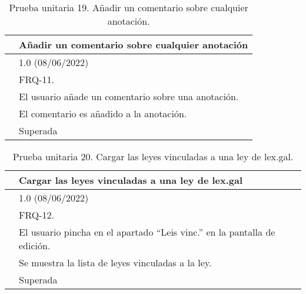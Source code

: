 \begin{table}[H]
\begin{center}
\begin{tabular}{|p{3cm}|p{10cm}|} \hline
\centering {\bf PU-19} & Añadir un comentario sobre cualquier anotación  \\ \hline\hline
\centering {\bf Versión} & 1.0 (08/06/2022) \\ \hline
\centering {\bf Dependencias} & FRQ-11. \\ \hline
\centering {\bf Descripción} &  El usuario añade un comentario sobre una anotación. \\ \hline
\centering {\bf Criterio de aceptación} & El comentario es añadido a la anotación. \\ \hline
\centering {\bf Estado} & Superada \\ \hline
\end{tabular}
\caption{Prueba unitaria 19. Añadir un comentario sobre cualquier anotación.}
\label{enlacePU19}
\end{center}
\end{table}

\begin{table}[H]
\begin{center}
\begin{tabular}{|p{3cm}|p{10cm}|} \hline
\centering {\bf PU-20} & Cargar las leyes vinculadas a una ley de lex.gal  \\ \hline\hline
\centering {\bf Versión} & 1.0 (08/06/2022) \\ \hline
\centering {\bf Dependencias} & FRQ-12. \\ \hline
\centering {\bf Descripción} &  El usuario pincha en el apartado ``Leis vinc.'' en la pantalla de edición. \\ \hline
\centering {\bf Criterio de aceptación} & Se muestra la lista de leyes vinculadas a la ley. \\ \hline
\centering {\bf Estado} & Superada \\ \hline
\end{tabular}
\caption{Prueba unitaria 20. Cargar las leyes vinculadas a una ley de lex.gal.}
\label{enlacePU20}
\end{center}
\end{table}


